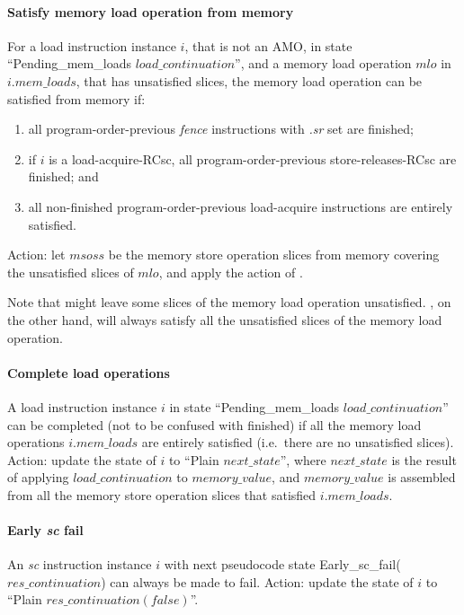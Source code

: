\paragraph{Satisfy memory load operation from memory}\label{omm:sat_from_mem}
For a load instruction instance $i$, that is not an AMO, in state ``{\sc Pending\_mem\_loads} $load\_continuation$'', and a memory load operation $mlo$ in $i.mem\_loads$, that has unsatisfied slices, the memory load operation can be satisfied from memory if:
\begin{enumerate}
\item all program-order-previous {\em fence} instructions with {\em .sr} set are finished;
\item if $i$ is a load-acquire-RCsc, all program-order-previous store-releases-RCsc are finished; and
\item all non-finished program-order-previous load-acquire instructions are entirely satisfied.
\end{enumerate}
Action: let $msoss$ be the memory store operation slices from memory covering the unsatisfied slices of $mlo$, and apply the action of .

\begin{commentary}
Note that  might leave some slices of the memory load operation unsatisfied.
, on the other hand, will always satisfy all the unsatisfied slices of the memory load operation.
\end{commentary}


\paragraph{Complete load operations}\label{omm:complete_loads}
A load instruction instance $i$ in state ``{\sc Pending\_mem\_loads} $load\_continuation$'' can be completed (not to be confused with finished) if all the memory load operations $i.mem\_loads$ are entirely satisfied (i.e.~there are no unsatisfied slices).
Action: update the state of $i$ to ``{\sc Plain} $next\_state$'', where $next\_state$ is the result of applying $load\_continuation$ to $memory\_value$, and $memory\_value$ is assembled from all the memory store operation slices that satisfied $i.mem\_loads$.


\paragraph{Early {\em sc} fail}\label{omm:early_sc_fail}
An {\em sc} instruction instance $i$ with next pseudocode state {\sc Early\_sc\_fail}($res\_continuation$) can always be made to fail.
Action: update the state of $i$ to ``{\sc Plain} $res\_continuation(false)$''.


